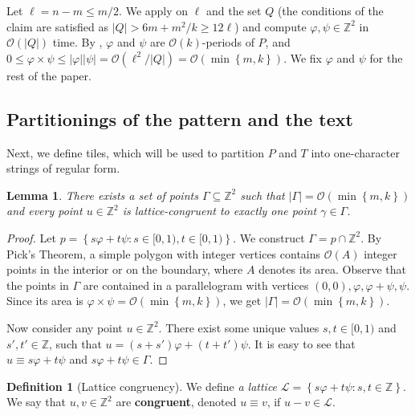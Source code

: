 \documentclass[11pt, letterpaper]{article}
\theoremstyle{plain}
\newtheorem{lemma}{Lemma}
\theoremstyle{definition}
\newtheorem{definition}{Definition}
\theoremstyle{remark}
\newcommand{\Z}{\mathbb{Z}}
\renewcommand{\O}{\mathcal{O}}
\renewcommand{\L}{\mathcal{L}}
\renewcommand{\phi}{\varphi}
\newcommand{\set}[1]{\left\lbrace #1 \right\rbrace}
\begin{document}
Let $\ell = n - m \le m / 2$. We apply  on $\ell$ and the set $Q$ (the conditions of the claim are satisfied as $|Q| > 6m + m^2/k \ge 12\ell$) and compute $\phi, \psi \in \Z^2$ in $\O(|Q|)$ time. By , $\phi$ and $\psi$ are $\O(k)$-periods of $P$, and $0 \le \phi \times \psi \le |\phi||\psi| = \O(\ell^2 / |Q|) =  \O(\min\set{m, k})$. We fix $\phi$ and $\psi$ for the rest of the paper.

\subsection{Partitionings of the pattern and the text}
Next, we define tiles, which will be used to partition $P$ and $T$ into one-character strings of regular form.

\begin{lemma} \label{lattice_base}
	There exists a set of points $\Gamma \subseteq \Z^2$ such that $|\Gamma| = \O(\min\set{m, k})$ and every point $u \in \Z^2$ is lattice-congruent to exactly one point $\gamma \in \Gamma$.
\end{lemma} 
	\begin{proof}
		Let $p = \set{s\phi + t\psi : s \in [0, 1), t \in [0, 1)}$.
		We construct $\Gamma = p \cap \Z^2$.
		By Pick's Theorem, a simple polygon with integer vertices contains $\O(A)$ integer points in the interior or on the boundary, where $A$ denotes its area.
		Observe that the points in $\Gamma$ are contained in a parallelogram with vertices $(0, 0), \phi, \phi + \psi, \psi$.
		Since its area is $\phi \times \psi = \O(\min\set{m, k})$, we get $|\Gamma| = \O(\min\set{m, k})$.
		
		Now consider any point $u \in \Z^2$.
		There exist some unique values $s, t \in [0, 1)$ and $s', t' \in \Z$, such that
		$u = (s + s') \phi + (t + t') \psi$.
		It is easy to see that
		$u \equiv s\phi + t\psi$ and $s\phi + t\psi \in \Gamma$.
	\end{proof}


\begin{definition}[Lattice congruency]\label{lattice_congruency}
We define \emph{a lattice} $\L = \set{s\phi + t\psi : s, t \in \Z}$. We say that $u, v \in \Z^2$ are \textbf{congruent}, denoted $u \equiv v$, if $u - v \in \L$. 
\end{definition}
\end{document}
